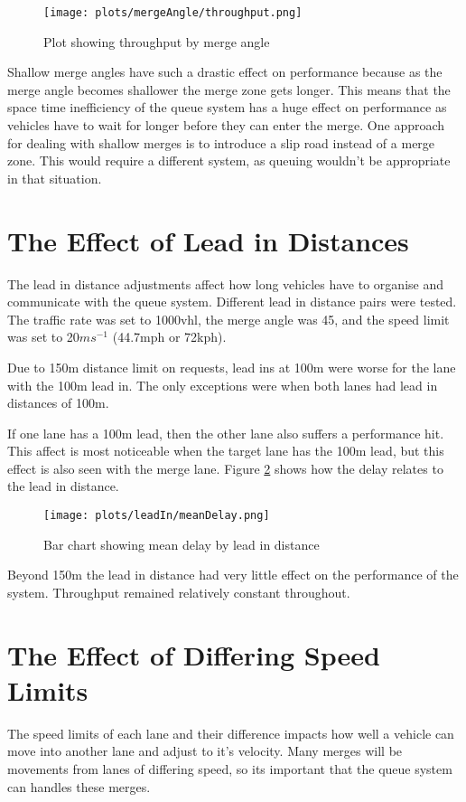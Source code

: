 \begin{figure}[htb]
\texttt{[image: plots/mergeAngle/throughput.png]}
\caption{Plot showing throughput by merge angle}
\label{fig:throughputMergeAngle}
\end{figure}

Shallow merge angles have such a drastic effect on performance because as the merge angle becomes shallower the merge zone gets longer. This means that the space time inefficiency of the queue system has a huge effect on performance as vehicles have to wait for longer before they can enter the merge. One approach for dealing with shallow merges is to introduce a slip road instead of a merge zone. This would require a different system, as queuing wouldn't be appropriate in that situation.

\section{The Effect of Lead in Distances}
\label{sec:The Effect of Lead in Distances}
The lead in distance adjustments affect how long vehicles have to organise and communicate with the queue system. Different lead in distance pairs were tested. The traffic rate was set to 1000\si{vhl}, the merge angle was 45\degree, and the speed limit was set to 20$\si{ms^{-1}}$ (44.7\si{mph} or 72\si{kph}).

Due to 150\si{m} distance limit on requests, lead ins at 100\si{m} were worse for the lane with the 100\si{m} lead in. The only exceptions were when both lanes had lead in distances of 100\si{m}.

If one lane has a 100\si{m} lead, then the other lane also suffers a performance hit. This affect is most noticeable when the target lane has the 100\si{m} lead, but this effect is also seen with the merge lane. Figure \ref{fig:meanDelayLeadIn} shows how the delay relates to the lead in distance.

\begin{figure}[htb]
\texttt{[image: plots/leadIn/meanDelay.png]}
\caption{Bar chart showing mean delay by lead in distance}
\label{fig:meanDelayLeadIn}
\end{figure}

Beyond 150\si{m} the lead in distance had very little effect on the performance of the system. Throughput remained relatively constant throughout.

\section{The Effect of Differing Speed Limits}
\label{sec:The Effect of Differing Speed Limits}
The speed limits of each lane and their difference impacts how well a vehicle can move into another lane and adjust to it's velocity. Many merges will be movements from lanes of differing speed, so its important that the queue system can handles these merges.

